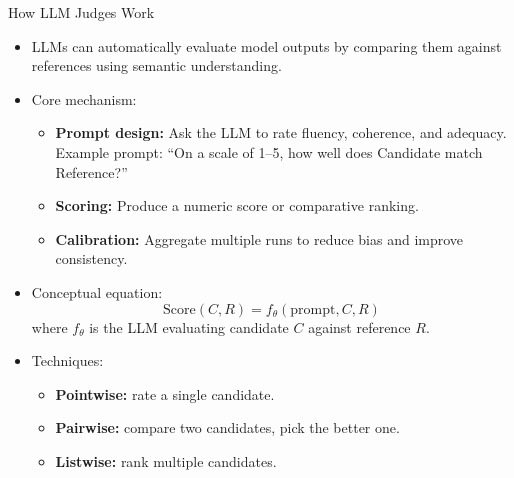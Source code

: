 \begin{frame}[allowframebreaks]{How LLM Judges Work}

\begin{itemize}
    \item LLMs can automatically evaluate model outputs by comparing them against references using semantic understanding.

    \item Core mechanism:
    \begin{itemize}
        \item \textbf{Prompt design:} Ask the LLM to rate fluency, coherence, and adequacy.  
        Example prompt: ``On a scale of 1–5, how well does Candidate match Reference?''
        \item \textbf{Scoring:} Produce a numeric score or comparative ranking.
        \item \textbf{Calibration:} Aggregate multiple runs to reduce bias and improve consistency.
    \end{itemize}
\framebreak
    \item Conceptual equation:
    \[
        \text{Score}(C, R) = f_\theta(\text{prompt}, C, R)
    \]
    where $f_\theta$ is the LLM evaluating candidate $C$ against reference $R$.

    \item Techniques:
    \begin{itemize}
        \item \textbf{Pointwise:} rate a single candidate.  
        \item \textbf{Pairwise:} compare two candidates, pick the better one.  
        \item \textbf{Listwise:} rank multiple candidates.
    \end{itemize}
\end{itemize}

\end{frame}



